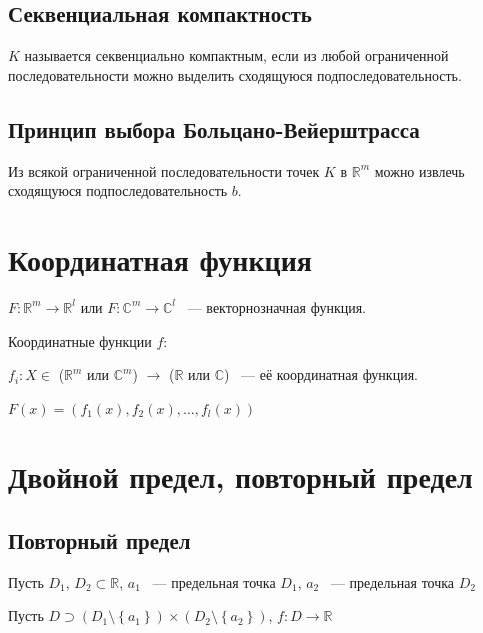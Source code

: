 \documentclass{article}
\begin{document}
        \subsection{Секвенциальная компактность}
            
            $K$ называется секвенциально компактным, если из любой ограниченной последовательности можно выделить сходящуюся подпоследовательность.
        
        \subsection{Принцип выбора Больцано-Вейерштрасса}
        
            Из всякой ограниченной последовательности точек $K$ в $\mathbb{R}^m$ можно извлечь сходящуюся подпоследовательность $b$.
            
    \newpage
    
    \section{Координатная функция}
    
        $F : \mathbb{R}^m \rightarrow \mathbb{R}^l$ или $F : \mathbb{C}^m \rightarrow \mathbb{C}^l$ ~--- векторнозначная функция.
        
        Координатные функции $f$:
        
        $f_i : X \in$ ($\mathbb{R}^m$ или $\mathbb{C}^m$) $\rightarrow$ ($\mathbb{R}$ или $\mathbb{C}$) ~--- её координатная функция.
        
        $F(x) = (f_1(x), f_2(x), \ldots, f_l(x))$
        
    \newpage
    
    \section{Двойной предел, повторный предел}
    
        \subsection{Повторный предел}
        
            Пусть $D_1$, $D_2 \subset \mathbb{R}$, $a_1$ ~--- предельная точка $D_1$, $a_2$ ~--- предельная точка $D_2$
        
            Пусть $D \supset \left(D_1 \setminus \left\{ a_1 \right\} \right) \times \left( D_2 \setminus \left\{ a_2 \right\} \right)$, $f : D \rightarrow \mathbb{R}$
        
\end{document}
